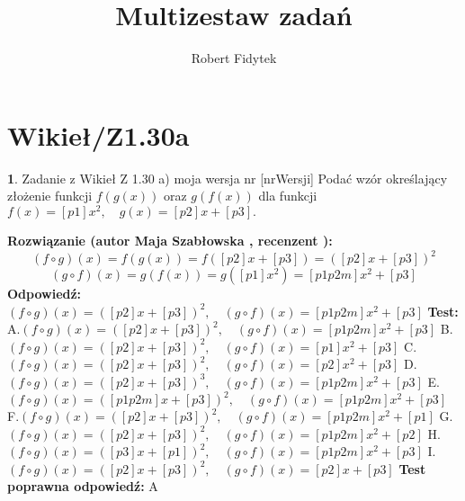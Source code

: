 \documentclass[12pt, a4paper]{article}
\title{Multizestaw zadań}
\author{Robert Fidytek}
\date{}
\theoremstyle{definition} %
\newtheorem{zad}{}
\newcommand{\kategoria}[1]{\section{#1}} %
\newcommand{\zadStart}[1]{\begin{zad}#1\newline} %
\newcommand{\zadStop}{\end{zad}}   %
\newcommand{\rozwStart}[2]{\noindent \textbf{Rozwiązanie (autor #1 , recenzent #2): }\newline} %
\newcommand{\rozwStop}{\newline}                                            %
\newcommand{\odpStart}{\noindent \textbf{Odpowiedź:}\newline}    %
\newcommand{\odpStop}{\newline}                                             %
\newcommand{\testStart}{\noindent \textbf{Test:}\newline} %
\newcommand{\testStop}{\newline} %
\newcommand{\kluczStart}{\noindent \textbf{Test poprawna odpowiedź:}\newline} %
\newcommand{\kluczStop}{\newline} %
\begin{document}
\maketitle


\kategoria{Wikieł/Z1.30a}
\zadStart{Zadanie z Wikieł Z 1.30 a)  moja wersja nr [nrWersji]}
Podać wzór określający złożenie funkcji $f(g(x))$ oraz $g(f(x))$ dla funkcji $f(x)=[p1]x^{2},\quad g(x)=[p2]x+[p3].$
\zadStop
\rozwStart{Maja Szabłowska}{}
$$(f\circ g)(x)=f(g(x))=f([p2]x+[p3])=([p2]x+[p3])^{2}$$
$$(g\circ f)(x)=g(f(x))=g([p1]x^{2})=[p1p2m]x^{2}+[p3]$$
\rozwStop
\odpStart
$(f\circ g)(x)=([p2]x+[p3])^{2},\quad (g\circ f)(x)=[p1p2m]x^{2}+[p3]$
\odpStop
\testStart
A.$(f\circ g)(x)=([p2]x+[p3])^{2},\quad (g\circ f)(x)=[p1p2m]x^{2}+[p3]$
B.$(f\circ g)(x)=([p2]x+[p3])^{2},\quad (g\circ f)(x)=[p1]x^{2}+[p3]$
C.$(f\circ g)(x)=([p2]x+[p3])^{2},\quad (g\circ f)(x)=[p2]x^{2}+[p3]$
D.$(f\circ g)(x)=([p2]x+[p3])^{3},\quad (g\circ f)(x)=[p1p2m]x^{2}+[p3]$
E.$(f\circ g)(x)=([p1p2m]x+[p3])^{2},\quad (g\circ f)(x)=[p1p2m]x^{2}+[p3]$
F.$(f\circ g)(x)=([p2]x+[p3])^{2},\quad (g\circ f)(x)=[p1p2m]x^{2}+[p1]$
G.$(f\circ g)(x)=([p2]x+[p3])^{2},\quad (g\circ f)(x)=[p1p2m]x^{2}+[p2]$
H.$(f\circ g)(x)=([p3]x+[p1])^{2},\quad (g\circ f)(x)=[p1p2m]x^{2}+[p3]$
I.$(f\circ g)(x)=([p2]x+[p3])^{2},\quad (g\circ f)(x)=[p2]x+[p3]$
\testStop
\kluczStart
A
\kluczStop
\end{document}
